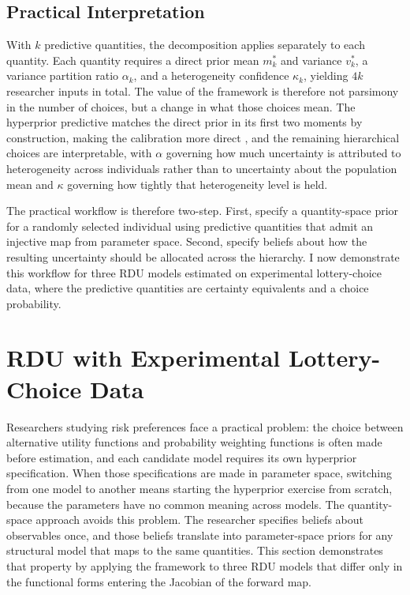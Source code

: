 \documentclass[12pt,a4paper]{article}
\theoremstyle{definition}
\theoremstyle{remark}
\newcommand{\dpm}{m^*}
\newcommand{\dpv}{v^*}
\begin{document}
\subsection{Practical Interpretation}

With $k$ predictive quantities, the decomposition applies separately to each
quantity. Each quantity requires a direct prior mean $\dpm_k$
and variance $\dpv_k$, a variance partition ratio $\alpha_k$, and a heterogeneity
confidence $\kappa_k$, yielding $4k$ researcher inputs in total. The value of
the framework is therefore not parsimony in the number of choices, but a
change in what those choices mean. The hyperprior predictive matches the
direct prior in its first two moments by construction, making the calibration
more direct \parencite{Gabry2019, Bland2025}, and the remaining hierarchical
choices are interpretable, with $\alpha$ governing how much uncertainty is
attributed to heterogeneity across individuals rather than to uncertainty
about the population mean and $\kappa$ governing how tightly that
heterogeneity level is held.

The practical workflow is therefore two-step. First, specify a quantity-space
prior for a randomly selected individual using predictive quantities that admit
an injective map from parameter space. Second, specify beliefs about how the
resulting uncertainty should be allocated across the hierarchy. I now
demonstrate this workflow for three RDU models estimated on experimental
lottery-choice data, where the predictive quantities are certainty equivalents
and a choice probability.

\section{RDU with Experimental Lottery-Choice Data}
\label{sec:application_rdu}

Researchers studying risk preferences face a practical problem: the choice
between alternative utility functions and probability weighting functions is
often made before estimation, and each candidate model requires its own
hyperprior specification. When those specifications are made in parameter
space, switching from one model to another means starting the hyperprior
exercise from scratch, because the parameters have no common meaning across
models. The quantity-space approach avoids this problem. The researcher
specifies beliefs about observables once, and those beliefs translate into
parameter-space priors for any structural model that maps to the same
quantities. This section demonstrates that property by applying the framework
to three RDU models that differ only in the functional forms entering the
Jacobian of the forward map.
\end{document}
